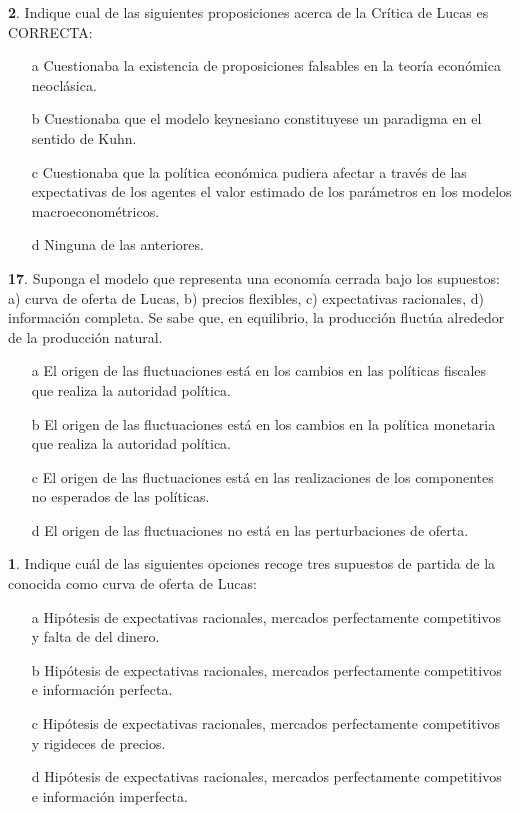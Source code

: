 \documentclass{nuevotema}
\begin{document}

\textbf{2}. Indique cual de las siguientes proposiciones acerca de la Crítica de Lucas es CORRECTA:

\begin{enumerate}
	\item[a] Cuestionaba la existencia de proposiciones falsables en la teoría económica neoclásica.
	\item[b] Cuestionaba que el modelo keynesiano constituyese un paradigma en el sentido de Kuhn.
	\item[c] Cuestionaba que la política económica pudiera afectar a través de las expectativas de los agentes el valor estimado de los parámetros en los modelos macroeconométricos.
	\item[d] Ninguna de las anteriores.
\end{enumerate}

\textbf{17}. Suponga el modelo que representa una economía cerrada bajo los supuestos: a) curva de oferta de Lucas, b) precios flexibles, c) expectativas racionales, d) información completa. Se sabe que, en equilibrio, la producción fluctúa alrededor de la producción natural.

\begin{enumerate}
	\item[a] El origen de las fluctuaciones está en los cambios en las políticas fiscales que realiza la autoridad política.
	\item[b] El origen de las fluctuaciones está en los cambios en la política monetaria que realiza la autoridad política.
	\item[c] El origen de las fluctuaciones está en las realizaciones de los componentes no esperados de las políticas.
	\item[d] El origen de las fluctuaciones no está en las perturbaciones de oferta.
\end{enumerate}

\textbf{1}. Indique cuál de las siguientes opciones recoge tres supuestos de partida de la conocida como curva de oferta de Lucas:
\begin{enumerate}
	\item[a] Hipótesis de expectativas racionales, mercados perfectamente competitivos y falta de  del dinero.
	\item[b] Hipótesis de expectativas racionales, mercados perfectamente competitivos e información perfecta.
	\item[c] Hipótesis de expectativas racionales, mercados perfectamente competitivos y rigideces de precios.
	\item[d] Hipótesis de expectativas racionales, mercados perfectamente competitivos e información imperfecta.
\end{enumerate}
\end{document}
